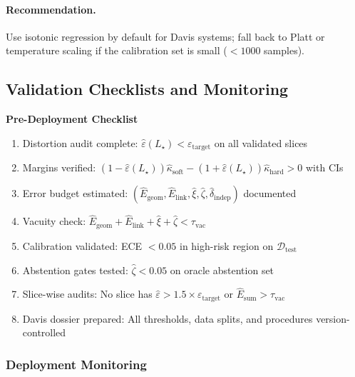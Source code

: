 \documentclass[11pt]{article}
\theoremstyle{remark}
\theoremstyle{plain}
\begin{document}
\paragraph{Recommendation.}
Use isotonic regression by default for Davis systems; fall back to Platt or temperature scaling if the calibration set is small ($<1000$ samples).

\subsection{Validation Checklists and Monitoring}
\label{subsec:validation-checklists}

\begin{mdframed}[linewidth=0.5pt,backgroundcolor=black!1]
\noindent\textbf{Pre-Deployment Checklist}
\begin{enumerate}[leftmargin=*,itemsep=2pt]
  \item[$\square$] Distortion audit complete: $\hat\varepsilon(L_\star) < \varepsilon_{\text{target}}$ on all validated slices
  \item[$\square$] Margins verified: $(1-\hat\varepsilon(L_\star))\hat\kappa_{\mathrm{soft}} - (1+\hat\varepsilon(L_\star))\hat\kappa_{\mathrm{hard}} > 0$ with CIs
  \item[$\square$] Error budget estimated: $(\hat E_{\mathrm{geom}}, \hat E_{\mathrm{link}}, \hat\xi, \hat\zeta, \hat\delta_{\mathrm{indep}})$ documented
  \item[$\square$] Vacuity check: $\hat E_{\mathrm{geom}} + \hat E_{\mathrm{link}} + \hat\xi + \hat\zeta < \tau_{\mathrm{vac}}$
  \item[$\square$] Calibration validated: ECE $< 0.05$ in high-risk region on $\mathcal{D}_{\mathrm{test}}$
  \item[$\square$] Abstention gates tested: $\hat\zeta < 0.05$ on oracle abstention set
  \item[$\square$] Slice-wise audits: No slice has $\hat\varepsilon > 1.5 \times \varepsilon_{\text{target}}$ or $\hat E_{\text{sum}} > \tau_{\mathrm{vac}}$
  \item[$\square$] Davis dossier prepared: All thresholds, data splits, and procedures version-controlled
\end{enumerate}
\end{mdframed}

\subsubsection{Deployment Monitoring}
\end{document}
